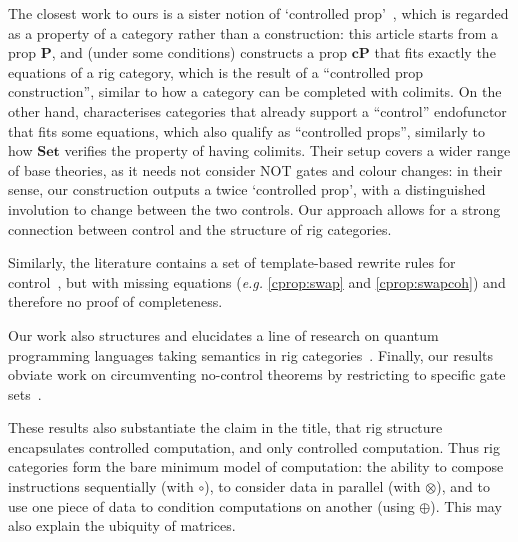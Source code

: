 \documentclass[a4paper]{article}
\theoremstyle{plain}
\theoremstyle{definition}
\newcommand{\cat}[1]{\mathbf{#1}}
\newcommand{\ccat}[1]{\mathbf{c #1}}
\begin{document}
\begin{enumerate}[(i)]
		The closest work to ours is a sister notion of `controlled
		prop'~\cite{delorme2025control}, which is regarded as a property of
		a category rather than a construction: this article starts from a prop
		$\cat P$, and (under some conditions) constructs a prop $\ccat P$ that
		fits exactly the equations of a rig category, which is the result of a
		``controlled prop  construction'', similar to how a category can be
		completed with colimits.  On the other hand, \cite{delorme2025control} characterises categories that already
		support a ``control'' endofunctor that fits some equations, which also
		qualify as ``controlled props'', similarly to how $\cat{Set}$ verifies the property
		of having colimits. 
		Their setup covers a wider range of base theories, as it needs not
		consider NOT gates and colour changes: in their sense, our
		construction outputs a twice `controlled prop', with a distinguished
		involution to change between the two controls. Our approach allows for
		a strong connection between control and the structure of rig
		categories. 
	
		Similarly, the literature contains a set of template-based
		rewrite rules for control~\cite{thomsenkaarsgaardsoeken:ricercar}, but
		with missing equations (\emph{e.g.} \ref{cprop:swap} and
		\ref{cprop:swapcoh}) and therefore no proof of completeness.

		Our work also structures and elucidates a line of research on
		quantum programming languages taking semantics in rig
		categories~\cite{carette2016computing, heunen2022information,
		carette2023quantum, carette2024easy, fangetal:hadamardpi}. Finally, our
		results obviate work on circumventing no-control theorems by
		restricting to specific gate sets~\cite{bisioetal:conditional}.
\end{enumerate}

These results also substantiate the claim in the title, that rig structure encapsulates controlled computation, and only controlled computation. Thus rig categories form the bare minimum model of computation: the ability to compose instructions sequentially (with $\circ$), to consider data in parallel (with $\otimes$), and to use one piece of data to condition computations on another (using $\oplus$). This may also explain the ubiquity of matrices.
\end{document}

